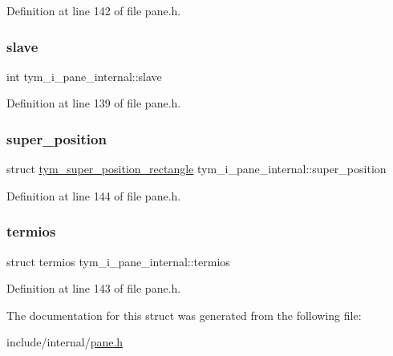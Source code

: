 Definition at line 142 of file pane.\+h.

\mbox{\label{structtym__i__pane__internal_aae38651ca650725201ea0e4a7ac5e893}} 
\subsubsection{\texorpdfstring{slave}{slave}}
{\footnotesize\ttfamily int tym\+\_\+i\+\_\+pane\+\_\+internal\+::slave}



Definition at line 139 of file pane.\+h.

\mbox{\label{structtym__i__pane__internal_a6130559b5f02e294f71981c51535fd06}} 
\subsubsection{\texorpdfstring{super\+\_\+position}{super\_position}}
{\footnotesize\ttfamily struct \hyperlink{structtym__super__position__rectangle}{tym\+\_\+super\+\_\+position\+\_\+rectangle} tym\+\_\+i\+\_\+pane\+\_\+internal\+::super\+\_\+position}



Definition at line 144 of file pane.\+h.

\mbox{\label{structtym__i__pane__internal_a4d03c0c97686307362307fd44c3edd50}} 
\subsubsection{\texorpdfstring{termios}{termios}}
{\footnotesize\ttfamily struct termios tym\+\_\+i\+\_\+pane\+\_\+internal\+::termios}



Definition at line 143 of file pane.\+h.



The documentation for this struct was generated from the following file\+:\begin{DoxyCompactItemize}
\item 
include/internal/\hyperlink{pane_8h}{pane.\+h}\end{DoxyCompactItemize}
